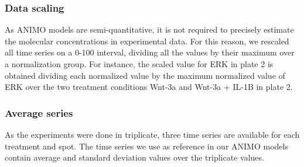 \subsubsection{Data scaling}
As ANIMO models are semi-quantitative, it is not required to precisely estimate the molecular concentrations
in experimental data. For this reason, we rescaled all time series on a 0-100 interval,
dividing all the values by their maximum over a normalization group. For instance,
the scaled value for ERK in plate 2 is obtained dividing each normalized value by
the maximum normalized value of ERK over the two treatment conditions Wnt-3a and Wnt-3a + IL-1B in plate 2.

\subsubsection{Average series}
As the experiments were done in triplicate, three time series are available
for each treatment and spot. The time series we use as reference in our ANIMO models
contain average and standard deviation values over the triplicate values.
